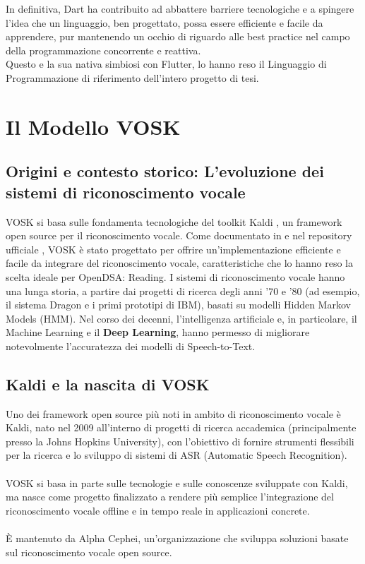 \documentclass[14pt]{extbook}
\begin{document}
In definitiva, Dart ha contribuito ad abbattere barriere tecnologiche e a spingere l’idea che un linguaggio, ben progettato, possa essere efficiente e facile da apprendere, pur mantenendo un occhio di riguardo alle best practice nel campo della programmazione concorrente e reattiva.\\

Questo e la sua nativa simbiosi con Flutter, lo hanno reso il Linguaggio di Programmazione di riferimento dell'intero progetto di tesi.\\
\pagebreak

\section{Il Modello VOSK}
\subsection{Origini e contesto storico: L'evoluzione dei sistemi di riconoscimento vocale}
VOSK si basa sulle fondamenta tecnologiche del toolkit Kaldi \cite{povey2011kaldi}, un framework open source per il riconoscimento vocale. Come documentato in \cite{voskdocs} e nel repository ufficiale \cite{voskgithub}, VOSK è stato progettato per offrire un'implementazione efficiente e facile da integrare del riconoscimento vocale, caratteristiche che lo hanno reso la scelta ideale per OpenDSA: Reading. I sistemi di riconoscimento vocale hanno una lunga storia, a partire dai progetti di ricerca degli anni ’70 e ’80 (ad esempio, il sistema Dragon e i primi prototipi di IBM), basati su modelli Hidden Markov Models (HMM). Nel corso dei decenni, l’intelligenza artificiale e, in particolare, il Machine Learning e il \textbf{Deep Learning}, hanno permesso di migliorare notevolmente l’accuratezza dei modelli di Speech-to-Text.\\

\subsection{Kaldi e la nascita di VOSK}
Uno dei framework open source più noti in ambito di riconoscimento vocale è Kaldi, nato nel 2009 all’interno di progetti di ricerca accademica (principalmente presso la Johns Hopkins University), con l’obiettivo di fornire strumenti flessibili per la ricerca e lo sviluppo di sistemi di ASR (Automatic Speech Recognition).\\\\
VOSK si basa in parte sulle tecnologie e sulle conoscenze sviluppate con Kaldi, ma nasce come progetto finalizzato a rendere più semplice l’integrazione del riconoscimento vocale offline e in tempo reale in applicazioni concrete.\\\\
È mantenuto da Alpha Cephei, un’organizzazione che sviluppa soluzioni basate sul riconoscimento vocale open source.
\end{document}
